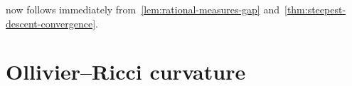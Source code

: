 \documentclass[10pt,a4paper]{amsart}
\newcommand{\prob}{{\mathscr{P}}}
\newcommand{\wass}{{\mathcal{W}}}
\newcommand{\setoftrees}{{\mathcal{T}}}
\begin{document}
%     
%

 now follows immediately from~\cref{lem:rational-measures-gap} and~\cref{thm:steepest-descent-convergence}.

\section{Ollivier--Ricci curvature}\label{sec:ollivier-ricci-curvature}
\end{document}
